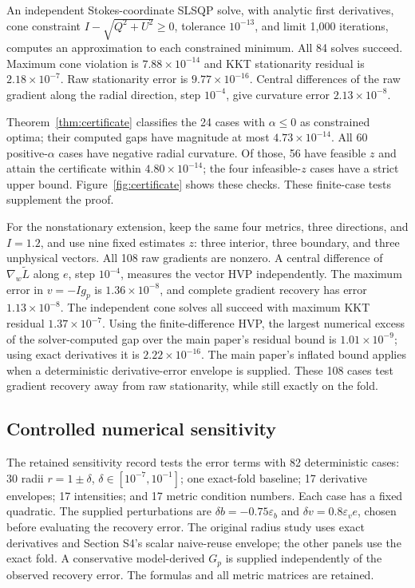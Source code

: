 An independent Stokes-coordinate SLSQP solve, with analytic first derivatives, cone constraint $I-\sqrt{Q^2+U^2}\geq0$, tolerance $10^{-13}$, and limit 1,000 iterations, computes an approximation to each constrained minimum. All 84 solves succeed. Maximum cone violation is $7.88\times10^{-14}$ and KKT stationarity residual is $2.18\times10^{-7}$. Raw stationarity error is $9.77\times10^{-16}$. Central differences of the raw gradient along the radial direction, step $10^{-4}$, give curvature error $2.13\times10^{-8}$.

Theorem~\ref{thm:certificate} classifies the 24 cases with $\alpha\leq0$ as constrained optima; their computed gaps have magnitude at most $4.73\times10^{-14}$. All 60 positive-$\alpha$ cases have negative radial curvature. Of those, 56 have feasible $z$ and attain the certificate within $4.80\times10^{-14}$; the four infeasible-$z$ cases have a strict upper bound. Figure~\ref{fig:certificate} shows these checks. These finite-case tests supplement the proof.

For the nonstationary extension, keep the same four metrics, three directions, and $I=1.2$, and use nine fixed estimates $z$: three interior, three boundary, and three unphysical vectors. All 108 raw gradients are nonzero. A central difference of $\nabla_w\widetilde L$ along $e$, step $10^{-4}$, measures the vector HVP independently. The maximum error in $v=-Ig_p$ is $1.36\times10^{-8}$, and complete gradient recovery has error $1.13\times10^{-8}$. The independent cone solves all succeed with maximum KKT residual $1.37\times10^{-7}$. Using the finite-difference HVP, the largest numerical excess of the solver-computed gap over the main paper's residual bound is $1.01\times10^{-9}$; using exact derivatives it is $2.22\times10^{-16}$. The main paper's inflated bound applies when a deterministic derivative-error envelope is supplied. These 108 cases test gradient recovery away from raw stationarity, while still exactly on the fold.




\subsection{Controlled numerical sensitivity}
The retained sensitivity record tests the error terms with 82 deterministic cases: 30 radii $r=1\pm\delta$, $\delta\in[10^{-7},10^{-1}]$; one exact-fold baseline; 17 derivative envelopes; 17 intensities; and 17 metric condition numbers. Each case has a fixed quadratic. The supplied perturbations are $\delta b=-0.75\varepsilon_b$ and $\delta v=0.8\varepsilon_ve$, chosen before evaluating the recovery error. The original radius study uses exact derivatives and Section S4's scalar naive-reuse envelope; the other panels use the exact fold. A conservative model-derived $G_p$ is supplied independently of the observed recovery error. The formulas and all metric matrices are retained.


